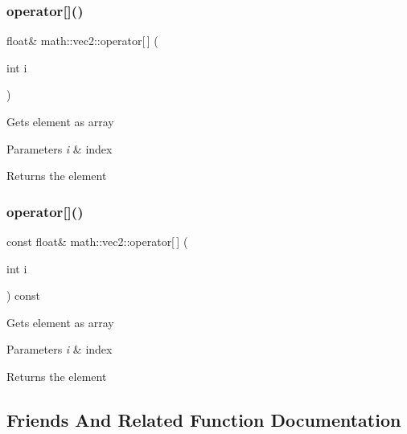 \subsubsection{\texorpdfstring{operator[]()}{operator[]()}\hspace{0.1cm}{\footnotesize\ttfamily [1/2]}}
{\footnotesize\ttfamily float\& math\+::vec2\+::operator\mbox{[}$\,$\mbox{]} (\begin{DoxyParamCaption}\item[{int}]{i }\end{DoxyParamCaption})\hspace{0.3cm}{\ttfamily [inline]}}

Gets element as array 
\begin{DoxyParams}{Parameters}
{\em i} & index \\
\hline
\end{DoxyParams}
\begin{DoxyReturn}{Returns}
the element 
\end{DoxyReturn}
\mbox{\label{structmath_1_1vec2_a62d6627cb78093fe11107ea52c284583}} 
\subsubsection{\texorpdfstring{operator[]()}{operator[]()}\hspace{0.1cm}{\footnotesize\ttfamily [2/2]}}
{\footnotesize\ttfamily const float\& math\+::vec2\+::operator\mbox{[}$\,$\mbox{]} (\begin{DoxyParamCaption}\item[{int}]{i }\end{DoxyParamCaption}) const\hspace{0.3cm}{\ttfamily [inline]}}

Gets element as array 
\begin{DoxyParams}{Parameters}
{\em i} & index \\
\hline
\end{DoxyParams}
\begin{DoxyReturn}{Returns}
the element 
\end{DoxyReturn}


\subsection{Friends And Related Function Documentation}
\mbox{\label{structmath_1_1vec2_acd0ced7ddd62abdb2a2afb8a37392037}} 

